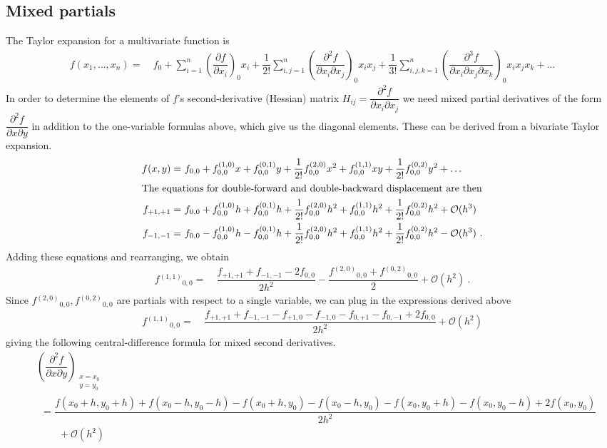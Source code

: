 \documentclass[11pt]{article}
\renewcommand{\sp}{\ \ \ \ \ \ \ \ \ \ }
\newcommand{\pt}{\partial}
\newcommand{\fr}[2]{\dfrac{#1}{#2}}
\newcommand{\pr}[1]{\left(#1\right)}
\newcommand{\ord}[1]{\ensuremath{^{(#1)}}}
\newcommand{\bigo}{\ensuremath{\mathcal{O}}}
\newcommand{\ld}{\ensuremath{\ldots}}
\newcommand{\miniar}[1]{\ensuremath{\begin{smallmatrix}#1\end{smallmatrix}}}
\begin{document}
\subsection*{Mixed partials}
The Taylor expansion
for a multivariate function is
\begin{align*}
    f(x_1,\ld,x_n) =&\ 
    f_0
    +\sum_{i=1}^n
    \pr{\fr{\pt f}{\pt x_i}}_0x_i
    +\fr{1}{2!}\sum_{i,j=1}^n
    \pr{\fr{\pt^2f}{\pt x_i\pt x_j}}_0x_ix_j
    +\fr{1}{3!}\sum_{i,j,k=1}^n
    \pr{\fr{\pt^3f}{\pt x_i\pt x_j\pt x_k}}_0
    x_ix_jx_k
    +\ld
\end{align*}
In order to determine the elements of $f$'s second-derivative (Hessian) matrix $H_{ij}=\fr{\pt^2 f}{\pt x_i\pt x_j}$ we need mixed
partial derivatives of the form $\fr{\pt^2f}{\pt x\pt y}$
in addition to the one-variable formulas above, which give us the diagonal elements.
These can be derived from a bivariate Taylor expansion.
\begin{align*}
    f(x,y) =&\
    f_{0,0} + f_{0,0}\ord{1,0}x + f_{0,0}\ord{0,1}y
    +\fr{1}{2!} f_{0,0}\ord{2,0}x^2
    +f_{0,0}\ord{1,1}xy
    +\fr{1}{2!} f_{0,0}\ord{0,2}y^2
    +\ld
\\\intertext{The equations for double-forward and double-backward displacement are then}
    f_{+1,+1} =&\ 
    f_{0,0} + f\ord{1,0}_{0,0}h+f\ord{0,1}_{0,0}h + 
    \fr{1}{2!}f\ord{2,0}_{0,0}h^2+f\ord{1,1}_{0,0} h^2
    +\fr{1}{2!} f\ord{0,2}_{0,0}h^2
    +\bigo(h^3)
    \\
    f_{-1,-1} =&\ 
    f_{0,0} - f\ord{1,0}_{0,0}h-f\ord{0,1}_{0,0}h + 
    \fr{1}{2!}f\ord{2,0}_{0,0}h^2+f\ord{1,1}_{0,0} h^2
    +\fr{1}{2!} f\ord{0,2}_{0,0}h^2
    -\bigo(h^3)\ .
\end{align*}
Adding these equations and rearranging, we obtain
\begin{align*}
    f\ord{1,1}_{0,0} =&\ 
    \fr{f_{+1,+1}+f_{-1,-1}-2f_{0,0} }{2h^2}
    -\fr{f\ord{2,0}_{0,0} + f\ord{0,2}_{0,0}}{2}
    +\bigo(h^2)\ .
\end{align*}
Since $f\ord{2,0}_{0,0}, f\ord{0,2}_{0,0}$ are partials with
respect to a single variable, we can plug in the expressions
derived above
\begin{align*}
    f\ord{1,1}_{0,0} =&\ 
    \fr{f_{+1,+1}+f_{-1,-1}
        -f_{+1,0}-f_{-1,0}
        -f_{0,+1}-f_{0,-1}+2f_{0,0}
    }{2h^2}
    +\bigo(h^2)
\end{align*}
giving the following central-difference formula for mixed second derivatives.
{\small
\begin{align*}
    &\pr{\fr{\pt^2f}{\pt x\pt y}}_{\miniar{x=x_0\\y=y_0}}\\ & \ \ =
    \fr{f(x_0+h,y_0+h)+f(x_0-h,y_0-h)-f(x_0+h,y_0)-f(x_0-h,y_0)-f(x_0,y_0+h)-f(x_0,y_0-h)+2f(x_0,y_0)}{2h^2} \\ &\sp + \bigo(h^2)
\end{align*}}
\end{document}
